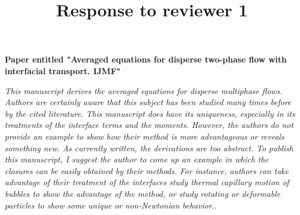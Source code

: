 \documentclass[10pt,a4paper]{article}
\begin{document}
\title{Response to reviewer 1} 
\maketitle
\textbf{Paper entitled "Averaged equations for disperse two-phase flow with interfacial transport. IJMF"}
\bigskip


\textit{This manuscript derives the averaged equations for disperse multiphase flows. Authors are
certainly aware that this subject has been studied many times before by the cited literature. This
manuscript does have its uniqueness, especially in its treatments of the interface terms and the
moments. However, the authors do not provide an example to show how their method is more
advantageous or reveals something new. As currently written, the derivations are too abstract. To
publish this manuscript, I suggest the author to come up an example in which the closures can be
easily obtained by their methods. For instance, authors can take advantage of their treatment of
the interfaces study thermal capillary motion of bubbles to show the advantage of the method, or
study rotating or deformable particles to show some unique or non-Newtonian behavior..}
\end{document}
